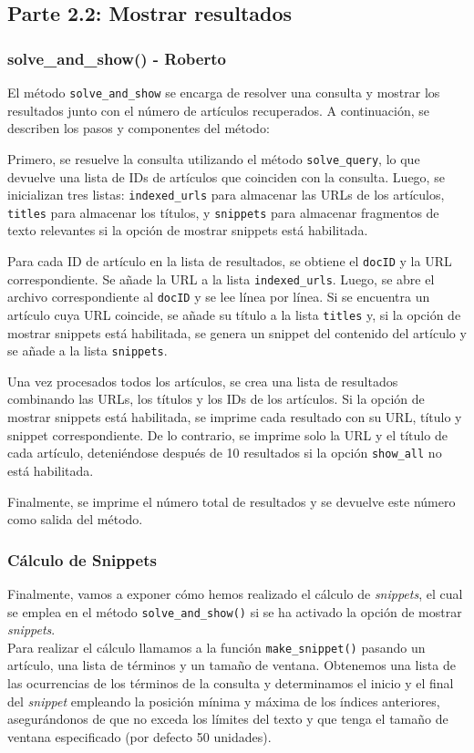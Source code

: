 \documentclass[12pt,a4paper]{article}
\begin{document}
\subsection{Parte 2.2: Mostrar resultados}
\subsubsection{solve\_and\_show() - Roberto}
El método \texttt{solve\_and\_show} se encarga de resolver una consulta y mostrar los resultados junto con el número de artículos recuperados. A continuación, se describen los pasos y componentes del método:

Primero, se resuelve la consulta utilizando el método \texttt{solve\_query}, lo que devuelve una lista de IDs de artículos que coinciden con la consulta. Luego, se inicializan tres listas: \texttt{indexed\_urls} para almacenar las URLs de los artículos, \texttt{titles} para almacenar los títulos, y \texttt{snippets} para almacenar fragmentos de texto relevantes si la opción de mostrar snippets está habilitada.

Para cada ID de artículo en la lista de resultados, se obtiene el \texttt{docID} y la URL correspondiente. Se añade la URL a la lista \texttt{indexed\_urls}. Luego, se abre el archivo correspondiente al \texttt{docID} y se lee línea por línea. Si se encuentra un artículo cuya URL coincide, se añade su título a la lista \texttt{titles} y, si la opción de mostrar snippets está habilitada, se genera un snippet del contenido del artículo y se añade a la lista \texttt{snippets}.

Una vez procesados todos los artículos, se crea una lista de resultados combinando las URLs, los títulos y los IDs de los artículos. Si la opción de mostrar snippets está habilitada, se imprime cada resultado con su URL, título y snippet correspondiente. De lo contrario, se imprime solo la URL y el título de cada artículo, deteniéndose después de 10 resultados si la opción \texttt{show\_all} no está habilitada.

Finalmente, se imprime el número total de resultados y se devuelve este número como salida del método.

\subsubsection{Cálculo de Snippets}
Finalmente, vamos a exponer cómo hemos realizado el cálculo de \textit{snippets}, el cual se emplea en el método \texttt{solve\_and\_show()} si se ha activado la opción de mostrar \textit{snippets}.\\
Para realizar el cálculo llamamos a la función \texttt{make\_snippet()} pasando un artículo, una lista de términos y un tamaño de ventana. Obtenemos una lista de las ocurrencias de los términos de la consulta y determinamos el inicio y el final del \textit{snippet} empleando la posición mínima y máxima de los índices anteriores, asegurándonos de que no exceda los límites del texto y que tenga el tamaño de ventana especificado (por defecto 50 unidades).
\end{document}
